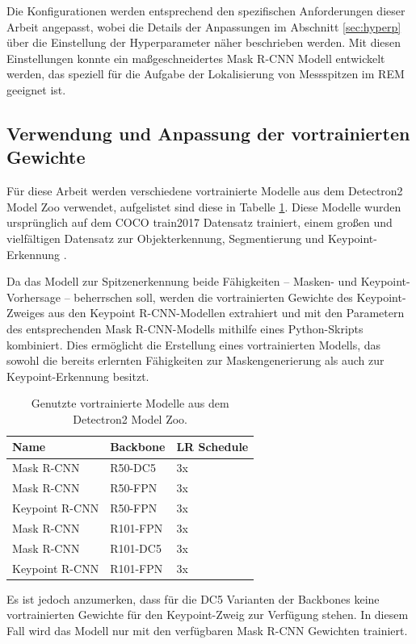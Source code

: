 Die Konfigurationen werden entsprechend den spezifischen Anforderungen dieser Arbeit angepasst, wobei die Details der Anpassungen im Abschnitt \ref{sec:hyperp} über die Einstellung der Hyperparameter näher beschrieben werden. Mit diesen Einstellungen konnte ein maßgeschneidertes Mask R-CNN Modell entwickelt werden, das speziell für die Aufgabe der Lokalisierung von Messspitzen im REM geeignet ist.
\subsection{Verwendung und Anpassung der vortrainierten Gewichte}
Für diese Arbeit werden verschiedene vortrainierte Modelle aus dem Detectron2 Model Zoo verwendet, aufgelistet sind diese in Tabelle \ref{tab:modelle}.
Diese Modelle wurden ursprünglich auf dem COCO \glqq train2017\grqq{} Datensatz trainiert, einem großen und vielfältigen Datensatz zur Objekterkennung, Segmentierung und Keypoint-Erkennung \cite{coco}.

Da das Modell zur Spitzenerkennung beide Fähigkeiten – Masken- und Keypoint-Vorhersage – beherrschen soll, werden die vortrainierten Gewichte des Keypoint-Zweiges aus den Keypoint R-CNN-Modellen extrahiert und mit den Parametern des entsprechenden Mask R-CNN-Modells mithilfe eines Python-Skripts kombiniert. Dies ermöglicht die Erstellung eines vortrainierten Modells, das sowohl die bereits erlernten Fähigkeiten zur Maskengenerierung als auch zur Keypoint-Erkennung besitzt.

\begin{table}[h]
\centering
\begin{tabular}{lll}
\toprule
\textbf{Name} & \textbf{Backbone} & \textbf{LR Schedule} \\
\midrule
Mask R-CNN & R50-DC5 & 3x \\
Mask R-CNN & R50-FPN & 3x \\
Keypoint R-CNN & R50-FPN & 3x \\
Mask R-CNN & R101-FPN & 3x \\
Mask R-CNN & R101-DC5 & 3x \\
Keypoint R-CNN & R101-FPN & 3x \\
\bottomrule
\end{tabular}
\caption{Genutzte vortrainierte Modelle aus dem Detectron2 Model Zoo.}
\label{tab:modelle}
\end{table}
Es ist jedoch anzumerken, dass für die DC5 Varianten der Backbones keine vortrainierten Gewichte für den Keypoint-Zweig zur Verfügung stehen. In diesem Fall wird das Modell nur mit den verfügbaren Mask R-CNN Gewichten trainiert.

